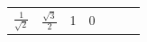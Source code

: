 {\begin{tabular}[t]{|l|l|l|l|l|l|l|}
                  $\frac{1}{\sqrt{2}}$
                 &
                  $\frac{\sqrt{3}}{2}$
                 &
        1 &
        0%
     \tabularnewline\cline{1-1}\cline{2-2}\cline{3-3}\cline{4-4}\cline{5-5}\cline{6-6}\cline{7-7}
    \end{tabular}} %
        \addtolength{\mytableboxheight}{\mytableboxdepth}
